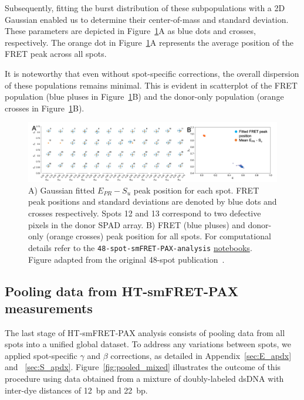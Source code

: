 Subsequently, fitting the burst distribution of these subpopulations with a 2D Gaussian enabled us to determine their center-of-mass and standard deviation. 
These parameters are depicted in Figure~\ref{fig:peak_Epr_S}A as blue dots and crosses, respectively. 
The orange dot in Figure~\ref{fig:peak_Epr_S}A represents the average position of the FRET peak across all spots. 

It is noteworthy that even without spot-specific corrections, the overall dispersion of these populations remains minimal.
This is evident in scatterplot of the FRET population (blue pluses in Figure~\ref{fig:peak_Epr_S}B) and the donor-only population (orange crosses in Figure~\ref{fig:peak_Epr_S}B).

\begin{figure}
\centering\includegraphics[width=1.0\linewidth]{chapters/figures/Epr_Su_peaks.png} 
\caption{\label{fig:peak_Epr_S}
A) Gaussian fitted $E_{PR} - S_u$ peak position for each spot.
FRET peak positions and standard deviations are denoted by blue dots and crosses respectively. 
Spots 12 and 13 correspond to two defective pixels in the donor \ac{SPAD} array.
B) FRET (blue pluses) and donor-only (orange crosses) peak position for all spots. 
For computational details refer to the \texttt{48-spot-smFRET-PAX-analysis} 
\href{https://github.com/tritemio/48-spot-smFRET-PAX-analysis}{notebooks}.
Figure adapted from the original 48-spot publication~\cite{ingargiola_JCP_2018}.}
\end{figure}

\subsection{Pooling data from HT-smFRET-PAX measurements}
\label{sec:pooling_data}

The last stage of \ac{HT-smFRET}-PAX analysis consists of pooling data from all spots into a unified global dataset. 
To address any variations between spots, we applied spot-specific $\gamma$ and $\beta$ corrections, as detailed in Appendix~\ref{sec:E_apdx} and ~\ref{sec:S_apdx}. 
Figure~\ref{fig:pooled_mixed} illustrates the outcome of this procedure using data obtained from a mixture of doubly-labeled \ac{dsDNA} with inter-dye distances of 12~\ac{bp} and 22~\ac{bp}.

